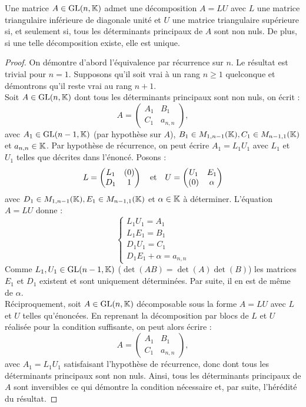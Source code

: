 \begin{thm}[Décomposition LU]
Une matrice $A \in \text{GL}(n,\mathbb{K})$ admet une décomposition $A = LU$ avec $L$ une matrice triangulaire inférieure de diagonale unité
et $U$ une matrice triangulaire supérieure si, et seulement si, tous les déterminants principaux de $A$ sont non nuls.
De plus, si une telle décomposition existe, elle est unique.
\end{thm}

\begin{proof}
On démontre d'abord l'équivalence par récurrence sur $n$. Le résultat est trivial pour $n=1$. 
Supposons qu'il soit vrai à un rang $n \geq 1$ quelconque et démontrons qu'il reste vrai au rang $n+1$. \\
Soit $A \in \text{GL}(n,\mathbb{K})$ dont tous les déterminants principaux sont non nuls, on écrit :
\[ A = \begin{pmatrix} A_1 & B_1 \\ C_1 & a_{n,n} \end{pmatrix} , \]
avec $A_1 \in \text{GL}(n-1,\mathbb{K})$ (par hypothèse sur $A$), $B_1 \in M_{1, n-1}(\mathbb{K}), C_1 \in M_{n-1,1}(\mathbb{K})$ et $a_{n,n} \in \mathbb{K}$.
Par hypothèse de récurrence, on peut écrire $A_1 = L_1 U_1$ avec $L_1$ et $U_1$ telles que décrites dans l'énoncé.
Posons :
\[ L = \begin{pmatrix} L_1 & (0) \\ D_1 & 1 \end{pmatrix} \quad \text{et} \quad U = \begin{pmatrix} U_1 & E_1 \\ (0) & \alpha \end{pmatrix} \]
avec $D_1 \in M_{1,n-1}(\mathbb{K}), E_1 \in  M_{n-1,1}(\mathbb{K})$ et $\alpha \in \mathbb{K}$ à déterminer. 
L'équation $A=LU$ donne :
\[ \left \{ \begin{array}{c}
L_1 U_1 = A_1 \\
L_1 E_1 = B_1 \\
D_1 U_1  = C_1 \\
D_1 E_1 + \alpha = a_{n,n} 
 \end{array} \right . \]
Comme $L_1, U_1 \in \text{GL}(n-1,\mathbb{K})$ ($\det(AB)=\det(A)\det(B)$) les matrices $E_1$ et $D_1$ existent et sont uniquement déterminées.
Par suite, il en est de même de $\alpha$. \\

Réciproquement, soit $A \in \text{GL}(n,\mathbb{K})$ décomposable sous la forme $A=LU$ avec $L$ et $U$ telles qu'énoncées.
En reprenant la décomposition par blocs de $L$ et $U$ réalisée pour la condition suffisante, on peut alors écrire :
\[ A = \begin{pmatrix} A_1 & B_1 \\ C_1 & a_{n,n} \end{pmatrix} , \]
avec $A_1 = L_1 U_1$ satisfaisant l'hypothèse de récurrence, donc dont tous les déterminants principaux sont non nuls.
Ainsi, tous les déterminants principaux de $A$ sont inversibles ce qui démontre la condition nécessaire et, par suite,
l'hérédité du résultat. \newline


\end{proof}
